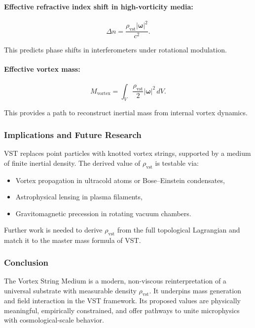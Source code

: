 \documentclass[11pt]{article}
\begin{document}
    \paragraph{Effective refractive index shift in high-vorticity media:}
    \[
        \Delta n = \frac{\rho_\text{vst} |\boldsymbol{\omega}|^2}{c^2}.
    \]

    This predicts phase shifts in interferometers under rotational modulation.

    \paragraph{Effective vortex mass:}
    \[
        M_\text{vortex} = \int_V \frac{\rho_\text{vst}}{2} |\boldsymbol{\omega}|^2 \, dV.
    \]

    This provides a path to reconstruct inertial mass from internal vortex dynamics.

    \subsubsection*{Implications and Future Research}

    VST replaces point particles with knotted vortex strings, supported by a medium of finite inertial density. The derived value of \( \rho_\text{vst} \) is testable via:

    \begin{itemize}
        \item Vortex propagation in ultracold atoms or Bose–Einstein condensates,
        \item Astrophysical lensing in plasma filaments,
        \item Gravitomagnetic precession in rotating vacuum chambers.
    \end{itemize}

    Further work is needed to derive \( \rho_\text{vst} \) from the full topological Lagrangian and match it to the master mass formula of VST.

    \subsubsection*{Conclusion}

    The Vortex String Medium is a modern, non-viscous reinterpretation of a universal substrate with measurable density \( \rho_\text{vst} \). It underpins mass generation and field interaction in the VST framework. Its proposed values are physically meaningful, empirically constrained, and offer pathways to unite microphysics with cosmological-scale behavior.
\end{document}
